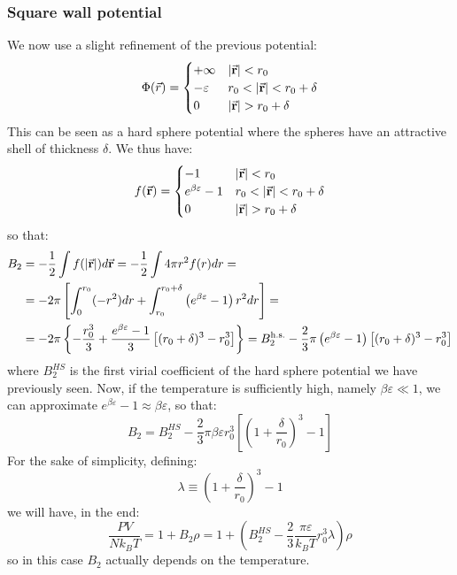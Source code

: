 \documentclass[../main/main.tex]{subfiles}
\begin{document}
\subsubsection{Square wall potential}
We now use a slight refinement of the previous potential:
\begin{equation}
   \Phi ({\vec {r}})={\begin{cases}+\infty &|{\va {r}}|<r_{0}\\-\varepsilon &r_{0}<|{\va {r}}|<r_{0}+\delta \\0&|{\va {r}}|>r_{0}+\delta \end{cases}}
\end{equation}
This can be seen as a hard sphere potential where the spheres have an attractive shell of thickness \( \delta  \). We thus have:
\begin{equation}
f({\va {r}})={\begin{cases}-1&|{\va {r}}|<r_{0}\\e^{\beta \varepsilon }-1&r_{0}<|{\va {r}}|<r_{0}+\delta \\0&|{\va {r}}|>r_{0}+\delta \end{cases}}
\end{equation}
so that:
\begin{equation*}
\begin{split}
  B_{2} & =-{\frac {1}{2}}\int f(|{\va {r}}|)d{\va {r}}=-{\frac {1}{2}}\int 4\pi r^{2}f(r)dr=\\
  &=-2\pi \left[\int _{0}^{r_{0}}(-r^{2})dr+\int _{r_{0}}^{r_{0}+\delta }\left(e^{\beta \varepsilon }-1\right)r^{2}dr\right]=\\
  &=-2\pi \left\lbrace -{\frac {r_{0}^{3}}{3}}+{\frac {e^{\beta \varepsilon }-1}{3}}\left[(r_{0}+\delta )^{3}-r_{0}^{3}\right]\right\rbrace =B_{2}^{\text{h.s.}}-{\frac {2}{3}}\pi \left(e^{\beta \varepsilon }-1\right)\left[(r_{0}+\delta )^{3}-r_{0}^{3}\right]
\end{split}
\end{equation*}
where  \( B_2^{HS} \) is the first virial coefficient of the hard sphere potential we have previously seen. Now, if the temperature is sufficiently high, namely \(  \beta \varepsilon \ll 1\), we can approximate \( e^{\beta \varepsilon }-1\approx \beta \varepsilon \), so that:
\begin{equation}
  B_{2}=B_2^{HS} -{\frac {2}{3}}\pi \beta \varepsilon r_{0}^{3}\left[\left(1+{\frac {\delta }{r_{0}}}\right)^{3}-1\right]
\end{equation}
For the sake of simplicity, defining:
\begin{equation*}
  \lambda \equiv \left(1+{\frac {\delta }{r_{0}}}\right)^{3}-1
\end{equation*}
we will have, in the end:
\begin{equation}
  { \frac {PV}{Nk_{B}T}}=1+B_{2}\rho =1+\left(B_2^{HS} -{\frac {2}{3}}{\frac {\pi \varepsilon }{k_{B}T}}r_{0}^{3}\lambda \right)\rho
\end{equation}
so in this case  \( B_2 \) actually depends on the temperature.
\end{document}
